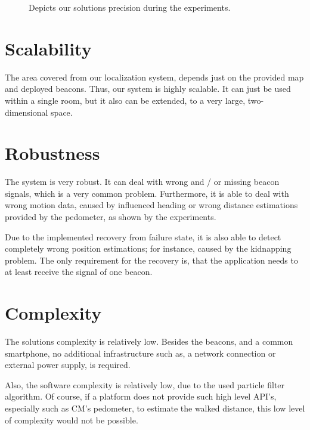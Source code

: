 
\begin{figure}
	
	\caption{Depicts our solutions precision during the experiments.}
	\label{fig:eval:precision}
\end{figure}



\section{Scalability}
The area covered from our localization system, depends just on the provided map and deployed beacons. Thus, our system is highly scalable. It can just be used within a single room, but it also can be extended, to a very large, two-dimensional space.

\section{Robustness}
The system is very robust. It can deal with wrong and / or missing beacon signals, which is a very common problem. Furthermore, it is able to deal with wrong motion data, caused by influenced heading or wrong distance estimations provided by the pedometer, as shown by the experiments.

Due to the implemented recovery from failure state, it is also able to detect completely wrong position estimations; for instance, caused by the kidnapping problem. The only requirement for the recovery is, that the application needs to at least receive the signal of one beacon.

\section{Complexity}
The solutions complexity is relatively low. Besides the beacons, and a common smartphone, no additional infrastructure such as, a network connection or external power supply, is required.
	
Also, the software complexity is relatively low, due to the used particle filter algorithm. Of course, if a platform does not provide such high level \acs{API}'s, especially such as \acl{CM}'s pedometer, to estimate the walked distance, this low level of complexity would not be possible.

